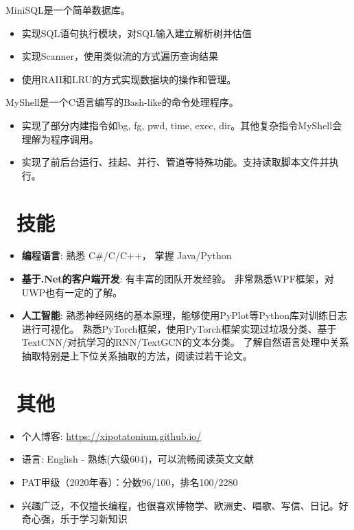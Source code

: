 \documentclass{resume}
\begin{document}
MiniSQL是一个简单数据库。
\begin{itemize}
  \item 实现SQL语句执行模块，对SQL输入建立解析树并估值
  \item 实现Scanner，使用类似流的方式遍历查询结果
  \item 使用RAII和LRU的方式实现数据块的操作和管理。
\end{itemize}

MyShell是一个C语言编写的Bash-like的命令处理程序。
\begin{itemize}
    \item 实现了部分内建指令如bg, fg, pwd, time, exec, dir。其他复杂指令MyShell会理解为程序调用。
    \item 实现了前后台运行、挂起、并行、管道等特殊功能。支持读取脚本文件并执行。
\end{itemize}

\section{\faCogs\ 技能}
\begin{itemize}[parsep=0.25ex]
    \item \textbf{编程语言}:
        熟悉 C\#/C/C++，
        掌握 Java/Python

    \item \textbf{基于.Net的客户端开发}:
        有丰富的团队开发经验。
        非常熟悉WPF框架，对UWP也有一定的了解。

    \item \textbf{人工智能}:
        熟悉神经网络的基本原理，能够使用PyPlot等Python库对训练日志进行可视化。
        熟悉PyTorch框架，使用PyTorch框架实现过垃圾分类、基于TextCNN/对抗学习的RNN/TextGCN的文本分类。
        了解自然语言处理中关系抽取特别是上下位关系抽取的方法，阅读过若干论文。

\end{itemize}


\section{\faInfo\ 其他}
\begin{itemize}[parsep=0.25ex]
  \item 个人博客: \url{https://xipotatonium.github.io/}
  \item 语言: English - 熟练(六级604)，可以流畅阅读英文文献
  \item PAT甲级（2020年春）：分数96/100，排名100/2280
  \item 兴趣广泛，不仅擅长编程，也很喜欢博物学、欧洲史、唱歌、写信、日记。好奇心强，乐于学习新知识
\end{itemize}
\end{document}
